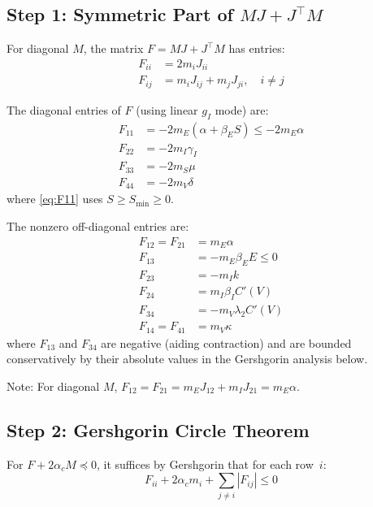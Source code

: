 \documentclass[11pt,twocolumn]{article}
\begin{document}
\subsection*{Step 1: Symmetric Part of $MJ + J^\top M$}

For diagonal $M$, the matrix $F = MJ + J^\top M$ has entries:
\begin{align*}
  F_{ii} &= 2 m_i J_{ii} \\
  F_{ij} &= m_i J_{ij} + m_j J_{ji}, \quad i \neq j
\end{align*}

The diagonal entries of $F$ (using linear $g_I$ mode) are:
\begin{align}
  F_{11} &= -2m_E(\alpha + \beta_E S) \leq -2m_E \alpha
    \label{eq:F11} \\
  F_{22} &= -2m_I \gamma_I
    \label{eq:F22} \\
  F_{33} &= -2m_S \mu
    \label{eq:F33} \\
  F_{44} &= -2m_V \delta
    \label{eq:F44}
\end{align}
where \eqref{eq:F11} uses $S \geq S_{\min} \geq 0$.

The nonzero off-diagonal entries are:
\begin{align}
  F_{12} = F_{21} &= m_E \alpha \label{eq:F12} \\
  F_{13} &= -m_E \beta_E E \leq 0 \label{eq:F13} \\
  F_{23} &= -m_I k \label{eq:F23} \\
  F_{24} &= m_I \beta_I C'(V) \label{eq:F24} \\
  F_{34} &= -m_V \lambda_2 C'(V) \label{eq:F34} \\
  F_{14} = F_{41} &= m_V \kappa \label{eq:F14}
\end{align}
where $F_{13}$ and $F_{34}$ are negative (aiding contraction)
and are bounded conservatively by their absolute values in the
Gershgorin analysis below.

Note: For diagonal $M$, $F_{12} = F_{21} = m_E J_{12} + m_I J_{21}
= m_E \alpha$.

\subsection*{Step 2: Gershgorin Circle Theorem}

For $F + 2\alpha_c M \preceq 0$, it suffices by Gershgorin that
for each row~$i$:
\begin{equation}
  F_{ii} + 2\alpha_c m_i + \!\sum_{j \neq i}\! |F_{ij}| \leq 0
  \label{eq:gershgorin}
\end{equation}
\end{document}
